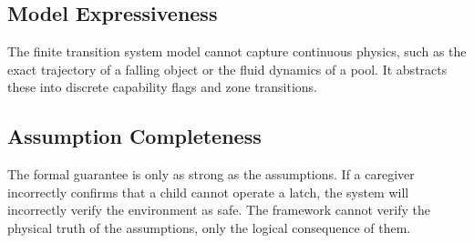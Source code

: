 \subsection{Model Expressiveness}
The finite transition system model cannot capture continuous physics, such as the exact trajectory of a falling object or the fluid dynamics of a pool. It abstracts these into discrete capability flags and zone transitions.

\subsection{Assumption Completeness}
The formal guarantee is only as strong as the assumptions. If a caregiver incorrectly confirms that a child cannot operate a latch, the system will incorrectly verify the environment as safe. The framework cannot verify the physical truth of the assumptions, only the logical consequence of them.
